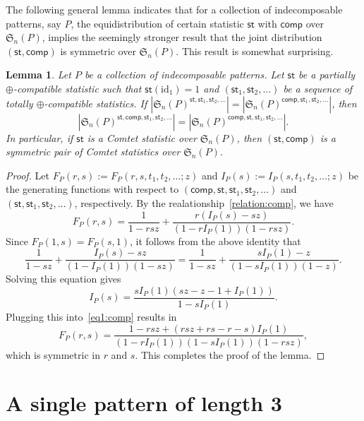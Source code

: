 \documentclass[12pt]{amsart}
\numberwithin{equation}{section}
\theoremstyle{plain}
\newtheorem{lemma}[theorem]{Lemma}
\theoremstyle{definition}
\def\S{\mathfrak{S}}
\def\comp{\mathsf{comp}}
\def\st{\mathsf{st}}
\def\F{\mathsf{F}}
\def\id{\mathrm{id}}
\begin{document}
The following general lemma indicates that for a collection of indecomposable patterns, say $P$, the equidistribution of certain statistic $\st$ with $\comp$ over $\S_n(P)$, implies the seemingly stronger result that the joint distribution $(\st, \comp)$ is symmetric over $\S_n(P)$. This result is somewhat surprising. 
\begin{lemma}\label{general:sym}
Let $P$ be a collection of indecomposable patterns. Let $\st$ be a partially  $\oplus$-compatible statistic such that $\st(\id_1)=1$ and  $(\st_1,\st_2,\ldots)$ be a sequence of totally  $\oplus$-compatible statistics. If $|\S_n(P)^{\st,\st_1,\st_2,\ldots}|=|\S_n(P)^{\comp,\st_1,\st_2,\ldots}|$, then 
$$
|\S_n(P)^{\st,\comp,\st_1,\st_2,\ldots}|=|\S_n(P)^{\comp,\st,\st_1,\st_2,\ldots}|.
$$
In particular, if $\st$ is a Comtet statistic over $\S_n(P)$, then $(\st,\comp)$ is a symmetric pair of Comtet statistics over $\S_n(P)$. 
\end{lemma}
\begin{proof}
Let $F_P(r,s):=F_P(r,s,t_1,t_2,\ldots;z)$  and $I_P(s):=I_P(s,t_1,t_2,\ldots;z)$ be the generating functions with respect to $(\comp,\st,\st_1,\st_2,\ldots)$ and $(\st,\st_1,\st_2,\ldots)$, respectively.  By the realationship~\eqref{relation:comp}, we have 
\begin{equation}\label{eq1:comp}
F_P(r,s)=\frac{1}{1-rsz}+\frac{r(I_P(s)-sz)}{(1-rI_P(1))(1-rsz)}.
\end{equation}
Since $F_P(1,s)=F_P(s,1)$, it follows from the above identity that 
$$
\frac{1}{1-sz}+\frac{I_P(s)-sz}{(1-I_P(1))(1-sz)}=\frac{1}{1-sz}+\frac{sI_P(1)-z}{(1-sI_P(1))(1-z)}.
$$
Solving this equation gives 
$$
I_P(s)=\frac{sI_P(1)(sz-z-1+I_P(1))}{1-sI_P(1)}.
$$
Plugging this into~\eqref{eq1:comp} results in 
\begin{equation}\label{gen:symm}
F_P(r,s)=\frac{1-rsz+(rsz+rs-r-s)I_P(1)}{(1-rI_P(1))(1-sI_P(1))(1-rsz)},
\end{equation}
which is symmetric in $r$ and $s$. This completes the proof of the lemma.
\end{proof}




 

\section{A single pattern of length 3}\label{sec:one 3-pattern}%
\end{document}
